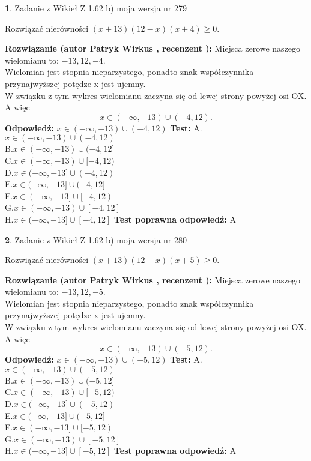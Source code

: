 \documentclass[12pt, a4paper]{article}
\theoremstyle{definition} %
\newtheorem{zad}{}
\newcommand{\zadStart}[1]{\begin{zad}#1\newline}
\newcommand{\zadStop}{\end{zad}}
\newcommand{\rozwStart}[2]{\noindent \textbf{Rozwiązanie (autor #1 , recenzent #2): }\newline}
\newcommand{\rozwStop}{\newline}
\newcommand{\odpStart}{\noindent \textbf{Odpowiedź:}\newline}
\newcommand{\odpStop}{\newline}
\newcommand{\testStart}{\noindent \textbf{Test:}\newline}
\newcommand{\testStop}{\newline}
\newcommand{\kluczStart}{\noindent \textbf{Test poprawna odpowiedź:}\newline}
\newcommand{\kluczStop}{\newline}
\begin{document}
\zadStart{Zadanie z Wikieł Z 1.62 b) moja wersja nr 279}

Rozwiązać nierówności $(x+13)(12-x)(x+4)\ge0$.
\zadStop
\rozwStart{Patryk Wirkus}{}
Miejsca zerowe naszego wielomianu to: $-13, 12, -4$.\\
Wielomian jest stopnia nieparzystego, ponadto znak współczynnika przy\linebreak najwyższej potędze x jest ujemny.\\ W związku z tym wykres wielomianu zaczyna się od lewej strony powyżej osi OX. A więc $$x \in (-\infty,-13) \cup (-4,12).$$
\rozwStop
\odpStart
$x \in (-\infty,-13) \cup (-4,12)$
\odpStop
\testStart
A.$x \in (-\infty,-13) \cup (-4,12)$\\
B.$x \in (-\infty,-13) \cup (-4,12]$\\
C.$x \in (-\infty,-13) \cup [-4,12)$\\
D.$x \in (-\infty,-13] \cup (-4,12)$\\
E.$x \in (-\infty,-13] \cup (-4,12]$\\
F.$x \in (-\infty,-13] \cup [-4,12)$\\
G.$x \in (-\infty,-13) \cup [-4,12]$\\
H.$x \in (-\infty,-13] \cup [-4,12]$
\testStop
\kluczStart
A
\kluczStop



\zadStart{Zadanie z Wikieł Z 1.62 b) moja wersja nr 280}

Rozwiązać nierówności $(x+13)(12-x)(x+5)\ge0$.
\zadStop
\rozwStart{Patryk Wirkus}{}
Miejsca zerowe naszego wielomianu to: $-13, 12, -5$.\\
Wielomian jest stopnia nieparzystego, ponadto znak współczynnika przy\linebreak najwyższej potędze x jest ujemny.\\ W związku z tym wykres wielomianu zaczyna się od lewej strony powyżej osi OX. A więc $$x \in (-\infty,-13) \cup (-5,12).$$
\rozwStop
\odpStart
$x \in (-\infty,-13) \cup (-5,12)$
\odpStop
\testStart
A.$x \in (-\infty,-13) \cup (-5,12)$\\
B.$x \in (-\infty,-13) \cup (-5,12]$\\
C.$x \in (-\infty,-13) \cup [-5,12)$\\
D.$x \in (-\infty,-13] \cup (-5,12)$\\
E.$x \in (-\infty,-13] \cup (-5,12]$\\
F.$x \in (-\infty,-13] \cup [-5,12)$\\
G.$x \in (-\infty,-13) \cup [-5,12]$\\
H.$x \in (-\infty,-13] \cup [-5,12]$
\testStop
\kluczStart
A
\kluczStop
\end{document}
